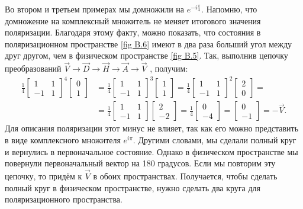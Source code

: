 Во втором и третьем примерах мы домножили на $e^{-i\frac{\pi}{4}}$. Напомню,
что домножение на комплексный множитель не меняет итогового значения
поляризации. Благодаря этому факту, можно показать, что состояния в
поляризационном пространстве \ref{fig B.6} имеют в два раза больший угол между
друг другом, чем в физическом пространстве \ref{fig B.5}. Так, выполнив цепочку
преобразований $\Vec{V} \rightarrow \Vec{D} \rightarrow \Vec{H} \rightarrow
  \Vec{A} \rightarrow \Vec{V}$ , получим:
\begin{align*}
  \frac{1}{4}\begin{bmatrix} 1 & 1 \\ -1 & 1 \end{bmatrix}^4\begin{bmatrix} 0 \\ 1 \end{bmatrix} &= \frac{1}{4}\begin{bmatrix} 1 & 1 \\ -1 & 1 \end{bmatrix}^3\begin{bmatrix} 1 \\ 1 \end{bmatrix} = \frac{1}{4}\begin{bmatrix} 1 & 1 \\ -1 & 1 \end{bmatrix}^2\begin{bmatrix} 2 \\ 0 \end{bmatrix} = \\
  &=\frac{1}{4}\begin{bmatrix} 1 & 1 \\ -1 & 1 \end{bmatrix}\begin{bmatrix} 2 \\ -2 \end{bmatrix} = \frac{1}{4}\begin{bmatrix} 0 \\ -4 \end{bmatrix} = \begin{bmatrix} 0 \\ -1 \end{bmatrix} = -\Vec{V}.
\end{align*}
Для описания поляризации этот минус не влияет, так как его можно представить в
виде комплексного множителя $e^{i\pi}$. Другими словами, мы сделали полный круг
и вернулись в первоначальное состояние. Однако в физическом пространстве мы
повернули первоначальный вектор на 180 градусов. Если мы повторим эту цепочку,
то придём к $\Vec{V}$ в обоих пространствах. Получается, чтобы сделать полный
круг в физическом пространстве, нужно сделать два круга для поляризационного
пространства.

